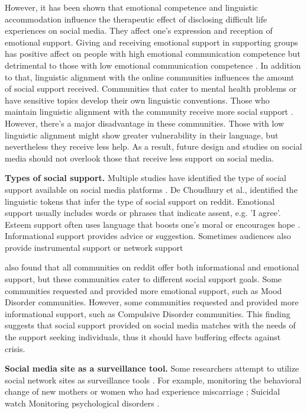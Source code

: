 However, it has been shown that emotional competence and linguistic accommodation influence the therapeutic effect of disclosing difficult life experiences on social media. They affect one's expression and reception of emotional support. Giving and receiving emotional support in supporting groups has positive affect on people with high emotional communication competence but detrimental to those with low emotional communication competence \cite{yoo2014giving}. In addition to that, linguistic alignment with the online communities influences the amount of social support received. Communities that cater to mental health problems or have sensitive topics develop their own linguistic conventions. Those who maintain linguistic alignment with the community receive more social support \cite{Sharma2018support}. However, there's a major disadvantage in these communities. Those with low linguistic alignment might show greater vulnerability in their language, but nevertheless they receive less help. As a result, future design and studies on social media should not overlook those that receive less support on social media.

\textbf{Types of social support.} Multiple studies have identified the type of social support available on social media platforms \cite{yoo2014giving}. De Choudhury et al.,
\citet{Sharma2018support} identified the linguistic tokens that infer the type of social support on reddit. Emotional support usually includes words or phrases that indicate assent, e.g. 'I agree'. Esteem support often uses language that boosts one's moral or encourages hope \cite{Sharma2018support}. Informational support provides advice or suggestion. Sometimes audiences also provide instrumental support or network support \cite{de2017language}

\citet{Sharma2018support} also found that all communities on reddit offer both informational and emotional support, but these communities cater to different social support goals. Some communities requested and provided more emotional support, such as Mood Disorder communities. However, some communities requested and provided more informational support, such as Compulsive Disorder communities. This finding suggests that social support provided on social media matches with the needs of the support seeking individuals, thus it should have buffering effects against crisis.

\textbf{Social media site as a surveillance tool.} Some researchers attempt to utilize social network sites as surveillance tools \cite{reece2017forecasting}. For example, monitoring the behavioral change of new mothers \cite{de_choudhury_major_2013} or women who had experience miscarriage \cite{andalibi_social_2016}; Suicidal watch \cite{de2017language, de2016discovering} Monitoring psychological disorders \cite{andalibi_sensitive_2017,de2013predicting}.

